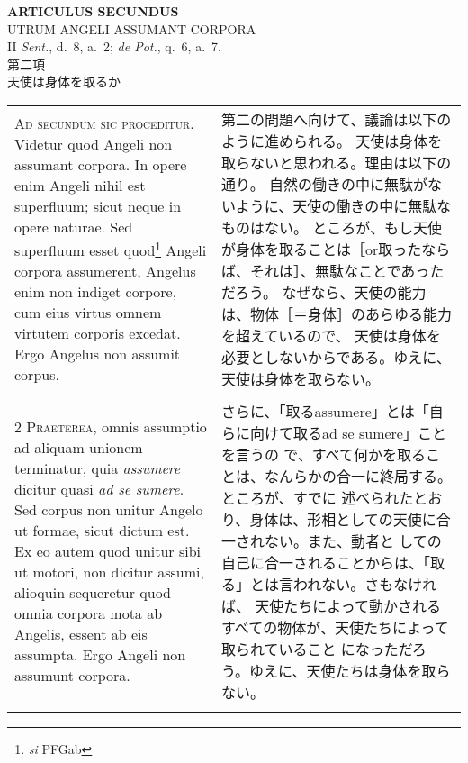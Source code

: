 \documentclass[10pt]{jsarticle} %
\begin{document}
\begin{center}
 {\Large {\bf ARTICULUS SECUNDUS}}\\
 {\large UTRUM ANGELI ASSUMANT CORPORA}\\
 {\footnotesize II {\itshape Sent.}, d.~8, a.~2; {\itshape de Pot.},
 q.~6, a.~7.}\\
 {\Large 第二項\\天使は身体を取るか}
\end{center}

\begin{longtable}{p{21em}p{21em}}

{\huge A}{\scshape d secundum sic proceditur}. Videtur quod
Angeli non assumant corpora. In opere enim Angeli nihil est superfluum;
sicut neque in opere naturae. Sed superfluum esset
 quod\footnote{{\itshape si} PFGab} Angeli corpora
assumerent, Angelus enim non indiget corpore, cum eius virtus omnem
virtutem corporis excedat. Ergo Angelus non assumit corpus.

&
第二の問題へ向けて、議論は以下のように進められる。
天使は身体を取らないと思われる。理由は以下の通り。
自然の働きの中に無駄がないように、天使の働きの中に無駄なものはない。
ところが、もし天使が身体を取ることは［or取ったならば、それは］、無駄なことであっただろう。
 なぜなら、天使の能力は、物体［＝身体］のあらゆる能力を超えているので、
 天使は身体を必要としないからである。ゆえに、天使は身体を取らない。

\\\\


{\scshape 2 Praeterea}, omnis assumptio ad aliquam unionem terminatur,
quia {\itshape assumere} dicitur quasi {\itshape ad se sumere}. Sed
corpus non unitur Angelo ut formae, sicut dictum est. Ex eo autem quod
unitur sibi ut motori, non dicitur assumi, alioquin sequeretur quod
omnia corpora mota ab Angelis, essent ab eis assumpta. Ergo Angeli non
assumunt corpora.

&

さらに、「取るassumere」とは「自らに向けて取るad se sumere」ことを言うの
 で、すべて何かを取ることは、なんらかの合一に終局する。ところが、すでに
 述べられたとおり、身体は、形相としての天使に合一されない。また、動者と
 しての自己に合一されることからは、「取る」とは言われない。さもなければ、
 天使たちによって動かされるすべての物体が、天使たちによって取られていること
 になっただろう。ゆえに、天使たちは身体を取らない。

\\\\



\end{longtable}
\end{document}
